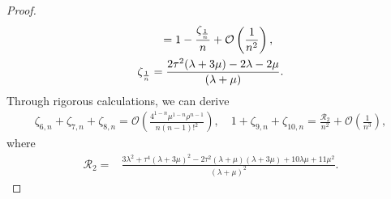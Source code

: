 \documentclass[11pt,reqno,twoside]{amsart}
\theoremstyle{definition}
\theoremstyle{remark}
\numberwithin{equation}{section}
\begin{document}
\begin{proof}
\begin{align}
		&\quad\quad=1-\frac{\zeta_{\frac{1}{n}}}{n}+\mathcal{O}\left(\frac{1}{n^2}\right),\notag\\
		&\zeta_{\frac{1}{n}}=\frac{2\tau ^2 (\lambda +3 \mu )-2\lambda -2\mu}{(\lambda +\mu )}.\notag
	\end{align}
	Through rigorous calculations, we can derive	
	\begin{align}\label{eq:zeta2}
		\zeta _{6,n}+\zeta _{7,n}+\zeta _{8,n}=\mathcal{O}\left(\frac{4^{1-n} \mu ^{1-n} \rho ^{n-1}}{n  (n-1)!^2}\right),\quad
		1+\zeta _{9,n}+\zeta _{10,n}=\frac{\mathcal{R}_{2}}{n^2}+\mathcal{O}\left(\frac{1}{n^3}\right),
	\end{align}
	where
	\begin{align}\label{eq:R2}
		\mathcal{R}_{2}=&\frac{3 \lambda ^2+\tau ^4 (\lambda +3 \mu )^2-2 \tau ^2 (\lambda +\mu ) (\lambda +3 \mu )+10 \lambda  \mu +11 \mu ^2}{(\lambda +\mu )^2}.
	\end{align}
	

\end{proof}
\end{document}
